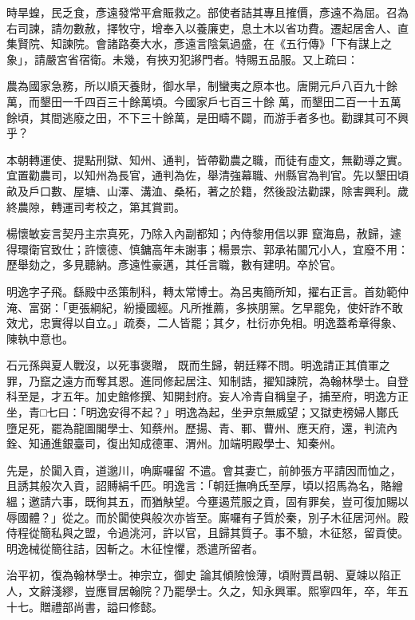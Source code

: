 \begin{pinyinscope}
 時旱蝗，民乏食，彥遠發常平倉賑救之。部使者詰其專且搉價，彥遠不為屈。召為右司諫，請勿數赦，擇牧守，增奉入以養廉吏，息土木以省功費。遷起居舍人、直集賢院、知諫院。會諸路奏大水，彥遠言陰氣過盛，在《五行傳》「下有謀上之象」，請嚴宮省宿衛。未幾，有挾刃犯謻門者。特賜五品服。又上疏曰：



 農為國家急務，所以順天養財，御水旱，制蠻夷之原本也。唐開元戶八百九十餘萬，而墾田一千四百三十餘萬頃。今國家戶七百三十餘
 萬，而墾田二百一十五萬餘頃，其間逃廢之田，不下三十餘萬，是田疇不闢，而游手者多也。勸課其可不興乎？



 本朝轉運使、提點刑獄、知州、通判，皆帶勸農之職，而徒有虛文，無勸導之實。宜置勸農司，以知州為長官，通判為佐，舉清強幕職、州縣官為判官。先以墾田頃畝及戶口數、屋塘、山澤、溝洫、桑柘，著之於籍，然後設法勸課，除害興利。歲終農隙，轉運司考校之，第其賞罰。



 楊懷敏妄言契丹主宗真死，乃除入內副都知；內侍黎用信以罪
 竄海島，赦歸，遽得環衛官致仕；許懷德、慎鏞高年未謝事；楊景宗、郭承祐闟冗小人，宜廢不用：歷舉劾之，多見聽納。彥遠性豪邁，其任言職，數有建明。卒於官。



 明逸字子飛。繇殿中丞策制科，轉太常博士。為呂夷簡所知，擢右正言。首劾範仲淹、富弼：「更張綱紀，紛擾國經。凡所推薦，多挾朋黨。乞早罷免，使奸詐不敢效尤，忠實得以自立。」疏奏，二人皆罷；其夕，杜衍亦免相。明逸蓋希章得象、陳執中意也。



 石元孫與夏人戰沒，以死事褒贈，
 既而生歸，朝廷釋不問。明逸請正其僨軍之罪，乃竄之遠方而奪其恩。進同修起居注、知制誥，擢知諫院，為翰林學士。自登科至是，才五年。加史館修撰、知開封府。妄人冷青自稱皇子，捕至府，明逸方正坐，青□七曰：「明逸安得不起？」明逸為起，坐尹京無威望；又獄吏榜婦人酇氏墮足死，罷為龍圖閣學士、知蔡州。歷揚、青、鄆、曹州、應天府，還，判流內銓、知通進銀臺司，復出知成德軍、渭州。加端明殿學士、知秦州。



 先是，於闐入貢，道邈川，唃廝囉留
 不遣。會其妻亡，前帥張方平請因而恤之，且誘其般次入貢，詔賻絹千匹。明逸言：「朝廷撫唃氏至厚，頃以招馬為名，賂繒縕；邀請六事，既徇其五，而猶觖望。今壅遏荒服之貢，固有罪矣，豈可復加賜以辱國體？」從之。而於闐使與般次亦皆至。廝囉有子質於秦，別子木征居河州。殿侍程從簡私與之盟，令過洮河，許以官，且歸其質子。事不驗，木征怒，留貢使。明逸械從簡往詰，因斬之。木征惶懼，悉遣所留者。



 治平初，復為翰林學士。神宗立，御史
 論其傾險憸薄，頃附賈昌朝、夏竦以陷正人，文辭淺繆，豈應冒居翰院？乃罷學士。久之，知永興軍。熙寧四年，卒，年五十七。贈禮部尚書，謚曰修懿。




\end{pinyinscope}
